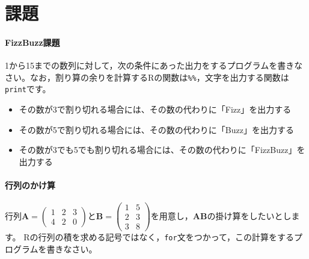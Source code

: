 \documentclass{ltjsbook}
\begin{document}
\section{課題}
\paragraph{FizzBuzz課題}
1から15までの数列に対して，次の条件にあった出力をするプログラムを書きなさい。なお，割り算の余りを計算するRの関数は\verb|%%|，文字を出力する関数は\verb|print|です。
\begin{itemize}
	\item その数が3で割り切れる場合には、その数の代わりに「Fizz」を出力する
	\item その数が5で割り切れる場合には、その数の代わりに「Buzz」を出力する
	\item その数が3でも5でも割り切れる場合には、その数の代わりに「FizzBuzz」を出力する
\end{itemize}

\paragraph{行列のかけ算}
行列$\bm{A} = \begin{pmatrix}1&2&3\\4&2&0\end{pmatrix}$と$\bm{B}=\begin{pmatrix}1&5\\2&3\\3&8\end{pmatrix}$を用意し，$\bm{AB}$の掛け算をしたいとします。
Rの行列の積を求める記号ではなく，\verb|for|文をつかって，この計算をするプログラムを書きなさい。
\end{document}
